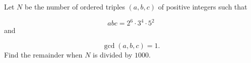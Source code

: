 Let $N$ be the number of ordered triples $(a,b,c)$ of positive integers such that

\[
abc=2^6\cdot3^4\cdot5^2
\]and

\[
\gcd(a,b,c)=1.
\]Find the remainder when $N$ is divided by $1000$.
